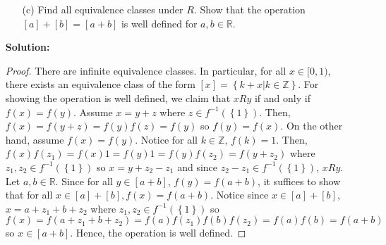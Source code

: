 \documentclass[letterpaper,12pt]{article}
\newcommand{\set}[1]{\left\{ #1 \right\}}
\theoremstyle{definition}
\begin{document}
\begin{enumerate}
    \item[] \begin{enumerate}
        \item[(c)] Find all equivalence classes under $R$. Show that the operation $[a] + [b] = [a+b]$ is well defined for $a,b \in \mathbb{R}$. 
    \end{enumerate}
     \begin{mdframed}
            \textbf{Solution:}
            \begin{proof}
            There are infinite equivalence classes. In particular, for all $x \in [0,1)$, there exists an equivalence class of the form $[x] = \set{k + x | k \in \mathbb{Z}}$. For showing the operation is well defined, we claim that $x Ry$ if and only if $f(x) = f(y)$. Assume $x = y + z$ where $z \in f^{-1}(\set{1})$. Then, $f(x) = f(y+z) = f(y)f(z) = f(y)$ so $f(y) = f(x)$. On the other hand, assume $f(x) = f(y)$. Notice for all $k \in \mathbb{Z}$, $f(k) = 1$. Then, $f(x)f(z_1) = f(x)1 = f(y)1 = f(y)f(z_2) = f(y+z_2)$ where $z_1,z_2 \in f^{-1}(\set{1})$ so $x = y + z_2 - z_1$ and since $z_2-z_1 \in f^{-1}(\set{1})$, $x R y$. Let $a, b \in \mathbb{R}$. Since for all $y \in [a+b]$, $f(y) = f(a+b)$, it suffices to show that for all $x \in [a] + [b], f(x) = f(a+b)$. Notice since $x \in [a] + [b]$, $x = a + z_1 + b + z_2$ where $z_1,z_2 \in f^{-1}(\set{1})$ so $f(x) = f(a+z_1+b+z_2) = f(a)f(z_1)f(b)f(z_2) = f(a)f(b) = f(a+b)$ so $x \in [a+b]$. Hence, the operation is well defined.
            
        \end{proof}
        \end{mdframed}
\end{enumerate}
\pagebreak
\end{document}

